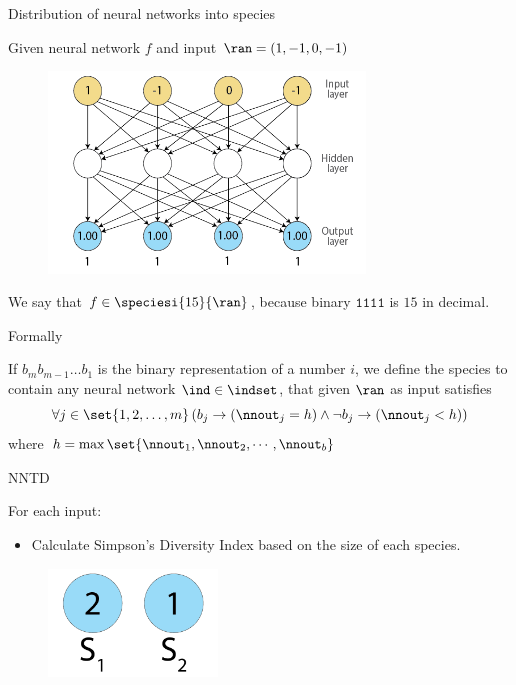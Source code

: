 \begin{frame}{Distribution of neural networks into species}
\begin{center}
Given neural network $f$ and input $\ran = (1, -1, 0, -1)$
  \begin{figure}[p]
  \includegraphics[width=0.75\textwidth]{images/nntdexample3.png}
  \end{figure}
We say that $f \in \speciesi{15}{\ran}$, because binary $\texttt{1111}$ is $15$ in decimal.
\end{center}
\end{frame}

\begin{frame}{Formally}
\begin{center}
If $b_{m}b_{m-1}\dots b_1$ is the binary representation of a number $i$, we define the species  to contain any neural network $\ind \in \indset$, that given $\ran$ as input satisfies
\begin{equation}
  \forall j \in \set{1, 2, \dots, m} \left(b_j \rightarrow (\nnout_j = h) \wedge \neg b_j \rightarrow (\nnout_j < h)\right)
\end{equation}
where $h = \max\set{\nnout_1, \nnout_2, \cdots, \nnout_b}$
\end{center}
\end{frame}

\begin{frame}{NNTD}
\begin{center}
For each input:
  \begin{itemize}
	  \item Calculate Simpson's Diversity Index based on the size of each species.
  \end{itemize}
     \begin{figure}[p]
  \includegraphics[width=0.4\textwidth]{images/speciessize.png}
  \end{figure}
\end{center}
\end{frame}

